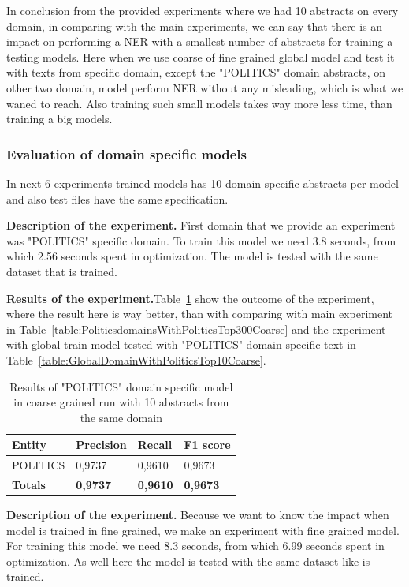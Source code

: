 \documentclass[thesis=M,english]{FITthesis}[2018/05/30]
\begin{document}
	In conclusion from the provided experiments where we had 10 abstracts on every domain, in comparing with the main experiments, we can say that there is an impact on performing a NER with a smallest number of abstracts for training a testing models. Here when we use coarse of fine grained global model and test it with texts from specific domain, except the "POLITICS" domain abstracts, on other two domain, model perform NER without any misleading, which is what we waned to reach. Also training such small models takes way more less time, than training a big models. 
 
 \subsubsection{Evaluation of domain specific models}
	In next 6 experiments trained models has 10 domain specific abstracts per model and also test files have the same specification.
	
	\textbf{Description of the experiment.} First domain that we provide an experiment was "POLITICS" specific domain. To train this model we need 3.8 seconds, from which 2.56 seconds spent in optimization. The model is tested with the same dataset that is trained. 
	
	\textbf{Results of the experiment.}Table~\ref{table:PoliticsDomainWithPoliticsTop10Coarse} show the outcome of the experiment, where the result here is way better, than with comparing with main experiment in Table~\ref{table:PoliticsdomainsWithPoliticsTop300Coarse} and the experiment with global train model tested with "POLITICS" domain specific text in Table~\ref{table:GlobalDomainWithPoliticsTop10Coarse}.  

	\begin{table}[H]\centering
		\begin{tabular}{|l|l|l|l|}
			\hline {\textbf{Entity}} & {\textbf{Precision}} & {\textbf{Recall}} & {\textbf{F1 score}}\\\hline
				POLITICS & 0,9737 & 0,9610 & 0,9673\\\hline
				\textbf{Totals} & \textbf{0,9737} & \textbf{0,9610} & \textbf{0,9673}\\\hline
		\end{tabular}
		\caption{Results of "POLITICS" domain specific model in coarse grained run with 10 abstracts from the same domain \label{table:PoliticsDomainWithPoliticsTop10Coarse}}
	\end{table}	
	
	\textbf{Description of the experiment.} Because we want to know the impact when model is trained in fine grained, we make an experiment with fine grained model. For training this model we need 8.3 seconds, from which 6.99 seconds spent in optimization. As well here the model is tested with the same dataset like is trained. 
	
\end{document}
